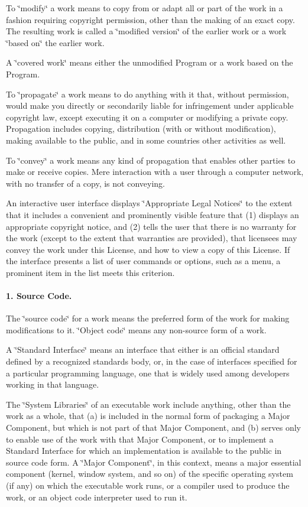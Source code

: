 To \char`\"{}modify\char`\"{} a work means to copy from or adapt all or part of the work in a fashion requiring copyright permission, other than the making of an exact copy. The resulting work is called a \char`\"{}modified version\char`\"{} of the earlier work or a work \char`\"{}based on\char`\"{} the earlier work.

A \char`\"{}covered work\char`\"{} means either the unmodified Program or a work based on the Program.

To \char`\"{}propagate\char`\"{} a work means to do anything with it that, without permission, would make you directly or secondarily liable for infringement under applicable copyright law, except executing it on a computer or modifying a private copy. Propagation includes copying, distribution (with or without modification), making available to the public, and in some countries other activities as well.

To \char`\"{}convey\char`\"{} a work means any kind of propagation that enables other parties to make or receive copies. Mere interaction with a user through a computer network, with no transfer of a copy, is not conveying.

An interactive user interface displays \char`\"{}\+Appropriate Legal Notices\char`\"{} to the extent that it includes a convenient and prominently visible feature that (1) displays an appropriate copyright notice, and (2) tells the user that there is no warranty for the work (except to the extent that warranties are provided), that licensees may convey the work under this License, and how to view a copy of this License. If the interface presents a list of user commands or options, such as a menu, a prominent item in the list meets this criterion.

\paragraph*{1. Source Code.}

The \char`\"{}source code\char`\"{} for a work means the preferred form of the work for making modifications to it. \char`\"{}\+Object code\char`\"{} means any non-\/source form of a work.

A \char`\"{}\+Standard Interface\char`\"{} means an interface that either is an official standard defined by a recognized standards body, or, in the case of interfaces specified for a particular programming language, one that is widely used among developers working in that language.

The \char`\"{}\+System Libraries\char`\"{} of an executable work include anything, other than the work as a whole, that (a) is included in the normal form of packaging a Major Component, but which is not part of that Major Component, and (b) serves only to enable use of the work with that Major Component, or to implement a Standard Interface for which an implementation is available to the public in source code form. A \char`\"{}\+Major Component\char`\"{}, in this context, means a major essential component (kernel, window system, and so on) of the specific operating system (if any) on which the executable work runs, or a compiler used to produce the work, or an object code interpreter used to run it.

